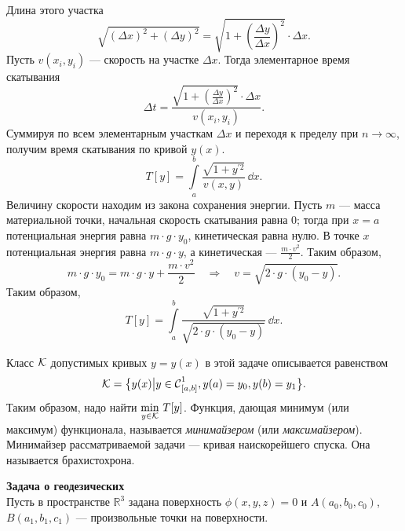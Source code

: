 \begin{enumerate2}
\begin{figure}[H]
\begin{tikzpicture}[x=0.75pt,y=0.75pt,yscale=-1,xscale=1]
		
	\end{tikzpicture}
	\caption{}
	\label{l1:fig:3}
	\end{figure}
	Длина этого участка
	\begin{equation*}
		\sqrt{(\Delta x)^2+(\Delta y)^2}=\sqrt{1+\left(\frac{\Delta y}{\Delta x}\right)^2}\cdot \Delta x.
	\end{equation*}
	Пусть $v(x_i, y_i)$ --- скорость на участке $\Delta x$. Тогда элементарное время скатывания
	\begin{equation*}
		\Delta t= \displaystyle \frac{\sqrt{1+\left(\frac{\Delta y}{\Delta x}\right)^2}\cdot \Delta x}{v(x_i, y_i)}. 
	\end{equation*}
	Суммируя по всем элементарным участкам $\Delta x$ и переходя к пределу при $n\to\infty$, получим время скатывания по кривой $y(x)$.
	\begin{equation*}
		 T[y]=\int\limits_a^b\frac{\sqrt{1+y^{\prime 2}}}{v(x,y)}\,\dd{x}.
	\end{equation*}
	Величину скорости находим из закона сохранения энергии. Пусть $m$ --- масса материальной точки, начальная скорость скатывания равна 0; тогда при $x=a$ потенциальная энергия равна $m\cdot g\cdot y_0$, кинетическая равна нулю. В точке $x$ потенциальная энергия равна $m\cdot g\cdot y$, а кинетическая --- $\frac{m\cdot v^2}{2}$. Таким образом{\mb,}
	\begin{equation*}
		m\cdot g\cdot y_0=m\cdot g\cdot y+\frac{m\cdot v^2}{2}\quad\Rightarrow \quad v=\sqrt{2\cdot g\cdot(y_0-y)}.
	\end{equation*}
	Таким образом{\mb,}  
	\begin{equation*}
		 T[y]=\int\limits_a^b\frac{\sqrt{1+y^{\prime 2}}}{\sqrt{2\cdot g\cdot(y_0-y)}}\,\dd{x}.
	\end{equation*}
	
	Класс $\mc{K}$ допустимых кривых $y=y(x)$ в этой задаче описывается равенством 	
	\begin{equation*}
		\mc{K}=\big\{y(x)\big|y\in\Cfn[{[a,b]}]{1}, y(a)=y_0, y(b)=y_1\big\}.
	\end{equation*}
	Таким образом{\mb,} надо найти $\min\limits_{y\in\mc{K}}\,T[y]$. Функция, дающая минимум (или максимум) функционала, называется \emph{минимайзером} (или \emph{максимайзером}). Минимайзер рассматриваемой задачи --- кривая наискорейшего спуска. Она называется брахистохрона.
	
	\item \textbf{Задача о геодезических}\\
	Пусть в пространстве $\mathbb{R}^3$ задана поверхность $\phi(x,y,z)=0$ и $A(a_0,b_0,c_0)$, $B(a_1,b_1,c_1)$ --- произвольные точки на поверхности.
	

\end{enumerate2}
